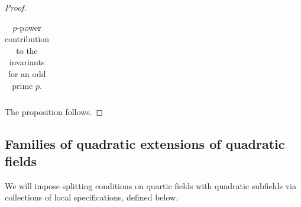 \documentclass[10pt]{article}
\theoremstyle{plain}
\theoremstyle{definition}
\theoremstyle{remark}
\begin{document}
\begin{proof}
\begin{table}[h!!!!!!]
\begin{center}
\begin{tabular}{|c||c|c|c|c|}
\end{tabular}
\caption{$p$-power contribution to the invariants for an odd prime $p$.}
\end{center}\vspace{-15pt}
\end{table}

\noindent The proposition follows. 
\end{proof}



\subsection{Families of quadratic extensions of quadratic fields}

We will impose splitting conditions on quartic fields with quadratic subfields via
collections of local specifications, defined below.
\end{document}
